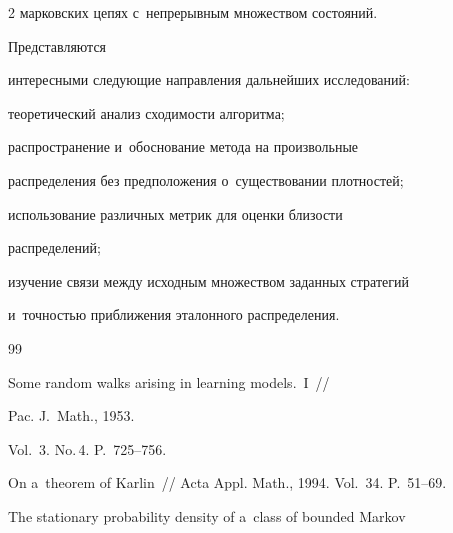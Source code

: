 \begin{multicols}{2}
марковских цепях с~непрерывным множеством со\-сто\-яний. 





Пред\-став\-ля\-ют\-ся 


интересными сле\-ду\-ющие на\-прав\-ле\-ния дальнейших исследований:






теоретический анализ сходимости алгоритма;




распространение и~обоснование метода на произвольные\linebreak 


распределения без предположения о~существовании плотностей;




  использование различных мет\-рик для оценки бли\-зости 


распределений;




  изучение связи между исходным множеством заданных стратегий 


и~точ\-ностью при\-бли\-же\-ния эталонного распределения.




  


{\small\frenchspacing


 {%




 \begin{thebibliography}{99}




   Some random walks arising in learning models.~I~// 


  Pac. J.~Math., 1953. 


Vol.~3. No.\,4. P.~725--756.




   On a~theorem of Karlin~// Acta Appl. Math., 1994. Vol.~34. P.~51--69.




   The stationary probability density of a~class of bounded Markov 



\end{thebibliography}}}
\end{multicols}
